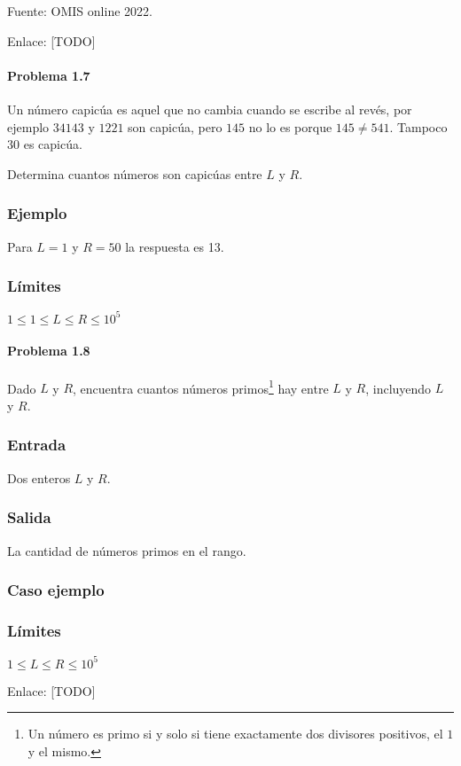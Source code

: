 Fuente: OMIS online 2022.

Enlace: [TODO]

\problembreak

\paragraph{Problema 1.7} Un número capicúa es aquel que no cambia cuando se escribe al revés, por ejemplo \(34143\) y \(1221\) son capicúa, pero \(145\) no lo es porque \(145\neq 541\). Tampoco \(30\) es capicúa.

Determina cuantos números son capicúas entre \(L\) y \(R\).

\subsubsection*{Ejemplo}
Para \(L=1\) y \(R=50\) la respuesta es 13.

\subsubsection*{Límites}
\(1 \leq 1  \leq L \leq R \leq 10^5 \)

\problembreak

\paragraph{Problema 1.8} Dado \(L\) y \(R\), encuentra cuantos números primos\footnote{Un número es primo si y solo si tiene exactamente dos divisores positivos, el \(1\) y el mismo.} hay entre \(L\) y \(R\), incluyendo \(L\) y \(R\).
 

\subsubsection*{Entrada}
Dos enteros \(L\) y \(R\).
\subsubsection*{Salida}
La cantidad de números primos en el rango.
\subsubsection{Caso ejemplo}
\begin{casebox3}
\end{casebox3}

\subsubsection*{Límites}
\begin{plimits}
	\item \(1\leq L \leq R \leq 10^5\)
\end{plimits}

Enlace: [TODO]
